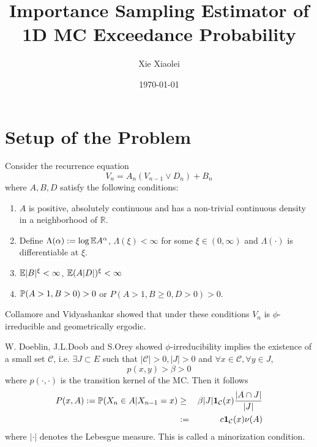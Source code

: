 \documentclass{beamer}
\title{Importance Sampling Estimator of 1D MC Exceedance Probability} %
\author{Xie Xiaolei} %
\institute[UCPH] %
{
Copenhagen University  \\ %
\medskip
\textit{hnq365@math.ku.dk} %
}
\date{\today} %
\begin{document}
\begin{frame}
\titlepage %
\end{frame}


\section{Setup of the Problem}
\begin{frame}
  Consider the recurrence equation 
  \[
  V_n = A_n (V_{n-1} \vee D_n) + B_n
  \]
  where $A, B, D$ satisfy the following conditions:
  \begin{enumerate}
  \item $A$ is positive, absolutely continuous and has a non-trivial continuous density in
    a neighborhood of $\mathbb R$.
  \item Define $\Lambda(\alpha) := \log \E A^\alpha$, $\Lambda(\xi) < \infty$ for some $\xi \in (0,
    \infty)$ and $\Lambda(\cdot)$ is differentiable at $\xi$.
  \item $\E |B|^\xi < \infty$, $\E (A|D|)^\xi < \infty$
  \item $\P(A > 1, B > 0) > 0$ or $P(A > 1, B \geq 0, D > 0) > 0$.
  \end{enumerate}
  Collamore and Vidyashankar showed \cite{Collamore20133378} that
  under these conditions $V_n$ is $\phi$-irreducible and geometrically
  ergodic.
\end{frame}

\begin{frame}
  W. Doeblin, J.L.Doob and S.Orey showed $\phi$-irreducibility implies
  the existence of a small set $\mathcal C$, i.e. $\exists J \subset
  E$ such that $|\mathcal C| > 0, |J| > 0$ and $\forall x \in \mathcal
  C, \forall y \in J$,
  \[
  p(x, y) > \beta > 0
  \]
  where $p(\cdot, \cdot)$ is the transition kernel of the MC. Then it
  follows
  \begin{eqnarray*}
    P(x, A) := \P(X_n \in A | X_{n-1}=x) &\geq& \beta |J|
    \I{\mathcal C}(x) {|A \cap J| \over |J|} \\
    &:=& c \I{\mathcal C}(x) \nu(A)
  \end{eqnarray*}
  where $|\cdot|$ denotes the Lebesgue measure. This is called a
  minorization condition.
\end{frame}
\end{document}
